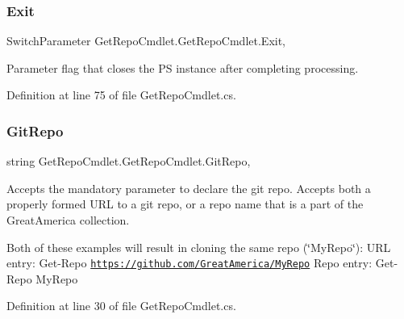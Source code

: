\subsubsection{\texorpdfstring{Exit}{Exit}}
{\footnotesize\ttfamily Switch\+Parameter Get\+Repo\+Cmdlet.\+Get\+Repo\+Cmdlet.\+Exit\hspace{0.3cm}{\ttfamily [get]}, {\ttfamily [set]}}



Parameter flag that closes the PS instance after completing processing. 



Definition at line 75 of file Get\+Repo\+Cmdlet.\+cs.

\mbox{\label{class_get_repo_cmdlet_1_1_get_repo_cmdlet_ab8b0954fb74d52faa018ff0b721f7291}} 
\subsubsection{\texorpdfstring{Git\+Repo}{GitRepo}}
{\footnotesize\ttfamily string Get\+Repo\+Cmdlet.\+Get\+Repo\+Cmdlet.\+Git\+Repo\hspace{0.3cm}{\ttfamily [get]}, {\ttfamily [set]}}



Accepts the mandatory parameter to declare the git repo. Accepts both a properly formed U\+RL to a git repo, or a repo name that is a part of the Great\+America collection. 

Both of these examples will result in cloning the same repo (\char`\"{}\+My\+Repo\char`\"{})\+: U\+RL entry\+: Get-\/\+Repo \href{https://github.com/GreatAmerica/MyRepo}{\tt https\+://github.\+com/\+Great\+America/\+My\+Repo} Repo entry\+: Get-\/\+Repo My\+Repo 

Definition at line 30 of file Get\+Repo\+Cmdlet.\+cs.

\mbox{\label{class_get_repo_cmdlet_1_1_get_repo_cmdlet_a11300c987e6547a3282664b6ff3c02d3}} 
